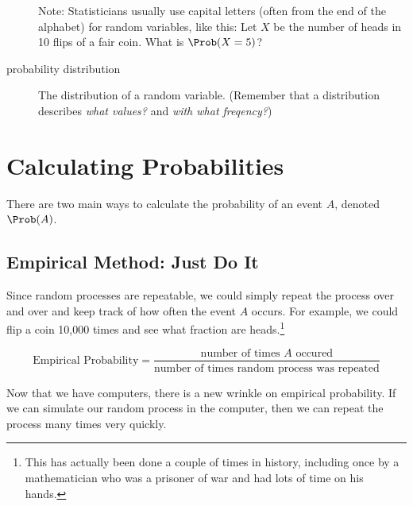 \documentclass[twoside]{book}\usepackage[]{graphicx}\usepackage[]{xcolor}
\newcounter{example}[section]
\begin{document}
\begin{description}
Note: Statisticians usually use capital letters (often from the end of the alphabet)
for random variables, like this:  
Let $X$ be the number of heads in 10 flips of a fair coin.  What is $\Prob(X=5)$?


\item[probability distribution]
The distribution of a random variable.
(Remember that a distribution describes \emph{what values?} and 
\emph{with what freqency?})
\end{description}

\newpage

\section{Calculating Probabilities}

There are two main ways to calculate the probability of an event
$A$, denoted $\Prob(A)$.

\subsection{Empirical Method: Just Do It}

Since random processes are repeatable, we could simply repeat the process
over and over and keep track of how often the event $A$ occurs.
For example, we could flip a coin 10,000 times and see what fraction 
are heads.\footnote{This has actually been done a couple of times 
in history, including once by a mathematician who was a prisoner of war
and had lots of time on his hands.}

\[
\mbox{Empirical Probability} = 
\frac{\mbox{number of times $A$ occured}}
{\mbox{number of times random process was repeated}}
\]

Now that we have computers, there is a new wrinkle on empirical probability.
If we can simulate our random process in the computer, then we can 
repeat the process many times very quickly.  
\end{document}

